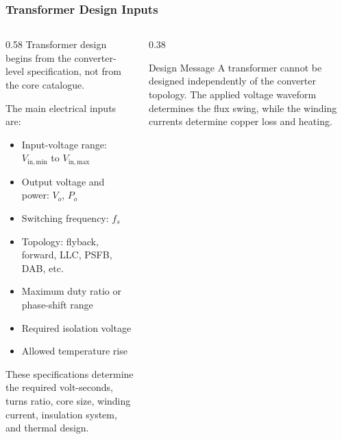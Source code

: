 \begin{frame}
    \frametitle{Transformer Design Inputs}

    \begin{columns}
        \begin{column}{0.58\textwidth}
            Transformer design begins from the converter-level specification, not from the core catalogue.

            \vspace{0.15cm}

            The main electrical inputs are:
            \begin{itemize}
                \item Input-voltage range: $V_{\mathrm{in,min}}$ to $V_{\mathrm{in,max}}$
                \item Output voltage and power: $V_o$, $P_o$
                \item Switching frequency: $f_s$
                \item Topology: flyback, forward, LLC, PSFB, DAB, etc.
                \item Maximum duty ratio or phase-shift range
                \item Required isolation voltage
                \item Allowed temperature rise
            \end{itemize}

            \vspace{0.15cm}

            These specifications determine the required volt-seconds, turns ratio, core size, winding current, insulation system, and thermal design.
        \end{column}

        \begin{column}{0.38\textwidth}
            \begin{block}{Design Message}
                \small
                A transformer cannot be designed independently of the converter topology. The applied voltage waveform determines the flux swing, while the winding currents determine copper loss and heating.
            \end{block}
        \end{column}
    \end{columns}
\end{frame}


